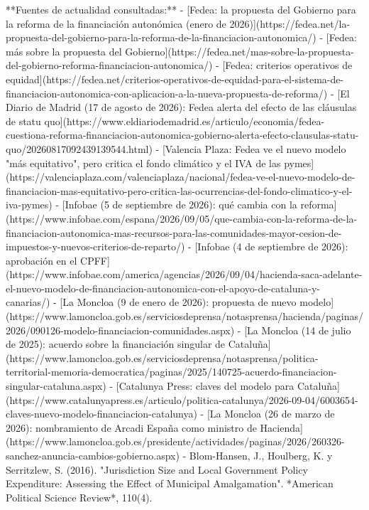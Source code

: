 \documentclass[10pt,a4paper]{article}
\begin{document}
{**Fuentes de actualidad consultadas:**
- [Fedea: la propuesta del Gobierno para la reforma de la financiación autonómica (enero de 2026)](https://fedea.net/la-propuesta-del-gobierno-para-la-reforma-de-la-financiacion-autonomica/)
- [Fedea: más sobre la propuesta del Gobierno](https://fedea.net/mas-sobre-la-propuesta-del-gobierno-reforma-financiacion-autonomica/)
- [Fedea: criterios operativos de equidad](https://fedea.net/criterios-operativos-de-equidad-para-el-sistema-de-financiacion-autonomica-con-aplicacion-a-la-nueva-propuesta-de-reforma/)
- [El Diario de Madrid (17 de agosto de 2026): Fedea alerta del efecto de las cláusulas de statu quo](https://www.eldiariodemadrid.es/articulo/economia/fedea-cuestiona-reforma-financiacion-autonomica-gobierno-alerta-efecto-clausulas-statu-quo/20260817092439139544.html)
- [Valencia Plaza: Fedea ve el nuevo modelo "más equitativo", pero critica el fondo climático y el IVA de las pymes](https://valenciaplaza.com/valenciaplaza/nacional/fedea-ve-el-nuevo-modelo-de-financiacion-mas-equitativo-pero-critica-las-ocurrencias-del-fondo-climatico-y-el-iva-pymes)
- [Infobae (5 de septiembre de 2026): qué cambia con la reforma](https://www.infobae.com/espana/2026/09/05/que-cambia-con-la-reforma-de-la-financiacion-autonomica-mas-recursos-para-las-comunidades-mayor-cesion-de-impuestos-y-nuevos-criterios-de-reparto/)
- [Infobae (4 de septiembre de 2026): aprobación en el CPFF](https://www.infobae.com/america/agencias/2026/09/04/hacienda-saca-adelante-el-nuevo-modelo-de-financiacion-autonomica-con-el-apoyo-de-cataluna-y-canarias/)
- [La Moncloa (9 de enero de 2026): propuesta de nuevo modelo](https://www.lamoncloa.gob.es/serviciosdeprensa/notasprensa/hacienda/paginas/2026/090126-modelo-financiacion-comunidades.aspx)
- [La Moncloa (14 de julio de 2025): acuerdo sobre la financiación singular de Cataluña](https://www.lamoncloa.gob.es/serviciosdeprensa/notasprensa/politica-territorial-memoria-democratica/paginas/2025/140725-acuerdo-financiacion-singular-cataluna.aspx)
- [Catalunya Press: claves del modelo para Cataluña](https://www.catalunyapress.es/articulo/politica-catalunya/2026-09-04/6003654-claves-nuevo-modelo-financiacion-catalunya)
- [La Moncloa (26 de marzo de 2026): nombramiento de Arcadi España como ministro de Hacienda](https://www.lamoncloa.gob.es/presidente/actividades/paginas/2026/260326-sanchez-anuncia-cambios-gobierno.aspx)
- Blom-Hansen, J., Houlberg, K. y Serritzlew, S. (2016). "Jurisdiction Size and Local Government Policy Expenditure: Assessing the Effect of Municipal Amalgamation". *American Political Science Review*, 110(4).
}
\end{document}
